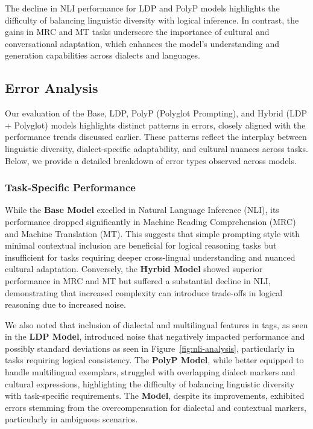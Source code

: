 The decline in NLI performance for LDP and PolyP models highlights the difficulty of balancing linguistic diversity with logical inference. In contrast, the gains in MRC and MT tasks underscore the importance of cultural and conversational adaptation, which enhances the model's understanding and generation capabilities across dialects and languages.

\subsection{Error Analysis}
Our evaluation of the Base, LDP, PolyP (Polyglot Prompting), and Hybrid (LDP + Polyglot) models highlights distinct patterns in errors, closely aligned with the performance trends discussed earlier. These patterns reflect the interplay between linguistic diversity, dialect-specific adaptability, and cultural nuances across tasks. Below, we provide a detailed breakdown of error types observed across models.

\subsubsection{Task-Specific Performance}
While the \textbf{Base Model} excelled in Natural Language Inference (NLI), its performance dropped significantly in Machine Reading Comprehension (MRC) and Machine Translation (MT). This suggests that simple prompting style with minimal contextual inclusion are beneficial for logical reasoning tasks but insufficient for tasks requiring deeper cross-lingual understanding and nuanced cultural adaptation. Conversely, the \textbf{Hyrbid Model} showed superior performance in MRC and MT but suffered a substantial decline in NLI, demonstrating that increased complexity can introduce trade-offs in logical reasoning due to increased noise.

We also noted that inclusion of dialectal and multilingual features in tags, as seen in the \textbf{LDP Model}, introduced noise that negatively impacted performance and possibly standard deviations as seen in Figure~\ref{fig:nli-analysis}, particularly in tasks requiring logical consistency. The \textbf{PolyP Model}, while better equipped to handle multilingual exemplars, struggled with overlapping dialect markers and cultural expressions, highlighting the difficulty of balancing linguistic diversity with task-specific requirements. The \textbf{ Model}, despite its improvements, exhibited errors stemming from the overcompensation for dialectal and contextual markers, particularly in ambiguous scenarios.

